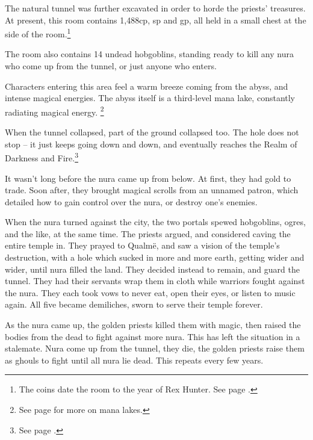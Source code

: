 \begin{multicols}{2}

The natural tunnel was further excavated in order to horde the priests' treasures.
At present, this room contains 1,488cp, \thepage sp and  gp, all held in a small chest at the side of the room.\footnote{The coins date the room to the year of Rex Hunter.
See page \pageref{r_hunter}.}

The room also contains 14 undead hobgoblins, standing ready to kill any nura who come up from the tunnel, or just anyone who enters.



Characters entering this area feel a warm breeze coming from the abyss, and intense magical energies.
The abyss itself is a third-level mana lake, constantly radiating magical energy.%
\footnote{See page \pageref{mana_lake} for more on mana lakes.}

\begin{exampletext}

When the tunnel collapsed, part of the ground collapsed too.  The hole does not stop -- it just keeps going down and down, and eventually reaches the Realm of Darkness and Fire.\footnote{See page \pageref{darknessandfire}.}

It wasn't long before the nura came up from below.  At first, they had gold to trade.  Soon after, they brought magical scrolls from an unnamed patron, which detailed how to gain control over the nura, or destroy one's enemies.

When the nura turned against the city, the two portals spewed hobgoblins, ogres, and the like, at the same time.
The priests argued, and considered caving the entire temple in.
They prayed to Qualm\"{e}, and saw a vision of the temple's destruction, with a hole which sucked in more and more earth, getting wider and wider, until nura filled the land.
They decided instead to remain, and guard the tunnel.
They had their servants wrap them in cloth while warriors fought against the nura.
They each took vows to never eat, open their eyes, or listen to music again.
All five became demiliches, sworn to serve their temple forever.

As the nura came up, the golden priests killed them with magic, then raised the bodies from the dead to fight against more nura.
This has left the situation in a stalemate.
Nura come up from the tunnel, they die, the golden priests raise them as ghouls to fight until all nura lie dead.
This repeats every few years.


\end{exampletext}
\end{multicols}
